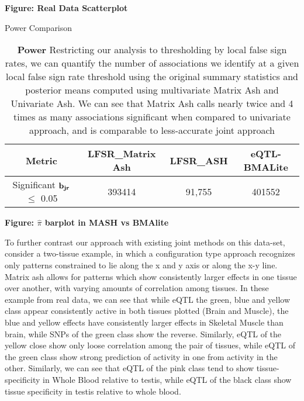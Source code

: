 \textbf{Figure: Real Data Scatterplot}

\begin{table}[ht]
\caption{Power Comparison}
\centering
\begin{tabular}{c c c c}
\hline\hline
Metric & LFSR_{Matrix Ash} & LFSR_{ASH}&eQTL-BMALite \\ [0.5ex] %
\hline
Significant $\bf{b}_{jr}$ $\leq$ 0.05%
&393414 & 91,755&401552\\
\hline
\end{tabular}
\label{table:power}
\caption{\textbf{Power} Restricting our analysis to thresholding by local false sign rates, we can quantify the number of associations we identify at a given local false sign rate threshold using the original summary statistics and posterior means computed using multivariate Matrix Ash and Univariate Ash. We can see that Matrix Ash calls nearly twice and 4 times as many associations significant when compared to univariate approach, and is comparable to less-accurate joint approach}
\end{table}\newline

\textbf{Figure: $\hat{\pi}$ barplot in MASH vs BMAlite}
\newline

To further contrast our approach with existing joint methods on this data-set, consider a two-tissue example, in which a configuration type approach recognizes only patterns constrained to lie along the x and y axis or along the x-y line. Matrix ash allows for patterns which show consistently larger effects in one tissue over another, with varying amounts of correlation among tissues. In these example from real data, we can see that while eQTL  the green, blue and yellow class appear consistently active in both tissues plotted (Brain and Muscle), the blue and yellow effects have consistently larger effects in Skeletal Muscle than brain, while SNPs of the green class show the reverse. Similarly, eQTL of the yellow close show only loose correlation among the pair of tissues, while eQTL of the green class show strong prediction of activity in one from activity in the other.  Similarly, we can see that eQTL of the pink class tend to show tissue-specificity in Whole Blood relative to testis, while eQTL of the black class show tissue specificity in testis relative to whole blood.\newline


